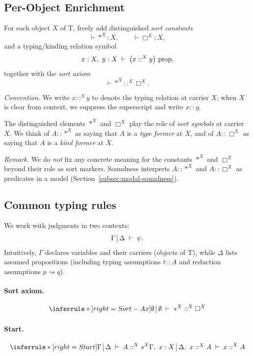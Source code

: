 \documentclass[11pt]{article}
\makeatletter
\theoremstyle{definition}
\theoremstyle{plain}
\theoremstyle{remark}
\theoremstyle{plain}
\newcommand{\judg}[3]{%
  \begingroup
    \setlength{\arraycolsep}{0.3ex}%
    \ensuremath{%
      \begin{array}[t]{@{}l@{\;}|@{\;}l@{}}%
        #1 & #2%
      \end{array}%
      \;\vdash\; #3%
    }%
  \endgroup
}
\newcommand{\rsq}{\rightsquigarrow}
\newcommand{\mrm}[1]{\mathrm{#1}}
\newcommand{\T}{\mrm{T}}
\makeatother
\begin{document}
\subsection{Per-Object Enrichment}
\label{subsec:per-object}

For each object $X$ of $\T$, freely add distinguished \emph{sort constants}
\[
  \vdash *^X : X, \qquad \vdash \Box^X : X,
\]
and a typing/kinding relation symbol
\[
  x:X,\ y:X \;\vdash\; \bigl(x ::^X y\bigr)\ {\rm prop},
\]
together with the \emph{sort axiom}
\[
  \vdash *^X ::^X \Box^X.
\]

\medskip

\noindent\textit{Convention.} We write $x ::^X y$ to denote the typing relation at carrier $X$; when $X$ is clear from context, we suppress the superscript and write $x :: y$.

The distinguished elements $*^{X}$ and $\Box^{X}$ play the role of \emph{sort symbols} at carrier $X$.  We think of $A::*^{X}$ as saying that $A$ is a \emph{type former} at $X$, and of $A::\Box^{X}$ as saying that $A$ is a \emph{kind former} at $X$.

\medskip

\noindent\textit{Remark.} We do \emph{not} fix any concrete meaning for the constants $*^X$ and $\Box^X$ beyond their role as sort markers. Soundness interprets $A::*^X$ and $A::\Box^X$ as predicates in a model (Section~\ref{subsec:modal-soundness}).

\subsection{Common typing rules}
\label{subsec:common-typing}

We work with judgments in two contexts:
\[
  \judg{\Gamma}{\Delta}{\psi}.
\]
Intuitively, $\Gamma$ declares variables and their carriers (objects of $\T$), while $\Delta$ lists assumed propositions (including typing assumptions $t::A$ and reduction assumptions $p\rsq q$).

\paragraph{Sort axiom.}
\[
\inferrule*[right={Sort-Ax}]
  { }
  { \judg{\emptyset}{\emptyset}{*^X ::^X \Box^X} }
\]

\paragraph{Start.}
\[
\inferrule*[right={Start}]
  { \judg{\Gamma}{\Delta}{A ::^X s^X} }
  { \judg{\Gamma,\ x:X}{\Delta,\ x::^X A}{x ::^X A} }
\]
\end{document}

